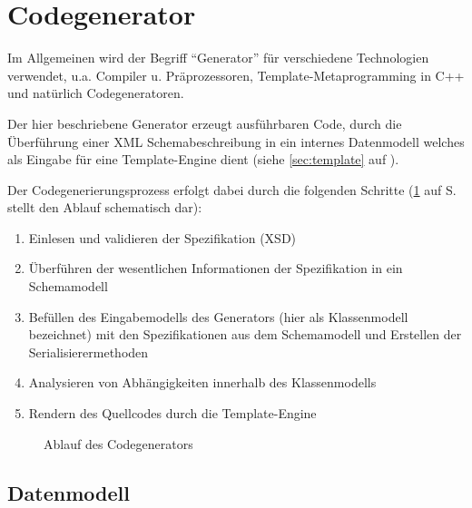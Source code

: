 \section{Codegenerator}


Im Allgemeinen wird der Begriff \enquote{Generator} für verschiedene Technologien verwendet, u.a. Compiler u. Präprozessoren, Template-Metaprogramming in C++ und natürlich Codegeneratoren.

Der hier beschriebene Generator erzeugt ausführbaren Code, durch die Überführung einer XML Schemabeschreibung in ein internes Datenmodell welches als Eingabe für eine Template-Engine dient (siehe \cref{sec:template} auf \pageref{sec:template}).

Der Codegenerierungsprozess erfolgt dabei durch die folgenden Schritte (\cref{fig:flow} auf S. \pageref{fig:flow} stellt den Ablauf schematisch dar):

\begin{enumerate}
    \item Einlesen und validieren der Spezifikation (\gls{XSD})
    \item Überführen der wesentlichen Informationen der Spezifikation in ein Schemamodell
    \item Befüllen des Eingabemodells des Generators (hier als Klassenmodell bezeichnet) mit den Spezifikationen aus dem Schemamodell und Erstellen der Serialisierermethoden
    \item Analysieren von Abhängigkeiten innerhalb des Klassenmodells
    \item Rendern des Quellcodes durch die Template-Engine
\end{enumerate}

\begin{figure}[h]
    \centering
    \resizebox{!}{0.7\textwidth}{
        
    }
    \caption{Ablauf des Codegenerators}
    \label{fig:flow}
\end{figure}

\subsection{Datenmodell}

